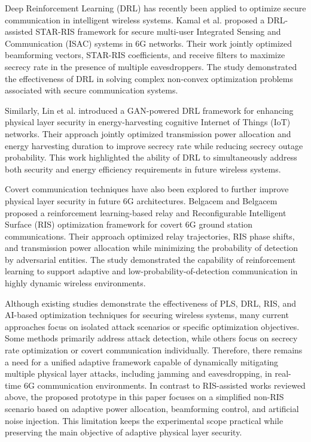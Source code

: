 \documentclass[conference]{IEEEtran}
\begin{document}
Deep Reinforcement Learning (DRL) has recently been applied to optimize secure communication in intelligent wireless systems. Kamal et al. \cite{b2} proposed a DRL-assisted STAR-RIS framework for secure multi-user Integrated Sensing and Communication (ISAC) systems in 6G networks. Their work jointly optimized beamforming vectors, STAR-RIS coefficients, and receive filters to maximize secrecy rate in the presence of multiple eavesdroppers. The study demonstrated the effectiveness of DRL in solving complex non-convex optimization problems associated with secure communication systems.

Similarly, Lin et al. \cite{b3} introduced a GAN-powered DRL framework for enhancing physical layer security in energy-harvesting cognitive Internet of Things (IoT) networks. Their approach jointly optimized transmission power allocation and energy harvesting duration to improve secrecy rate while reducing secrecy outage probability. This work highlighted the ability of DRL to simultaneously address both security and energy efficiency requirements in future wireless systems.

Covert communication techniques have also been explored to further improve physical layer security in future 6G architectures. Belgacem and Belgacem \cite{b5} proposed a reinforcement learning-based relay and Reconfigurable Intelligent Surface (RIS) optimization framework for covert 6G ground station communications. Their approach optimized relay trajectories, RIS phase shifts, and transmission power allocation while minimizing the probability of detection by adversarial entities. The study demonstrated the capability of reinforcement learning to support adaptive and low-probability-of-detection communication in highly dynamic wireless environments.

Although existing studies demonstrate the effectiveness of PLS, DRL, RIS, and AI-based optimization techniques for securing wireless systems, many current approaches focus on isolated attack scenarios or specific optimization objectives. Some methods primarily address attack detection, while others focus on secrecy rate optimization or covert communication individually. Therefore, there remains a need for a unified adaptive framework capable of dynamically mitigating multiple physical layer attacks, including jamming and eavesdropping, in real-time 6G communication environments. In contrast to RIS-assisted works reviewed above, the proposed prototype in this paper focuses on a simplified non-RIS scenario based on adaptive power allocation, beamforming control, and artificial noise injection. This limitation keeps the experimental scope practical while preserving the main objective of adaptive physical layer security.
\end{document}
